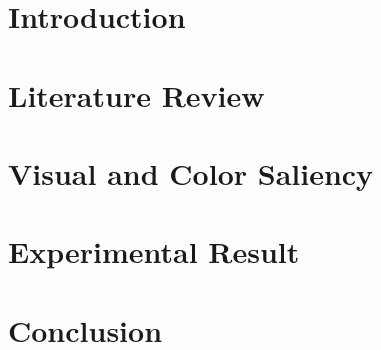 \documentclass[12pt]{report}
\begin{document}
\newpage
{}

\tableofcontents

\listoffigures


\chapter{Introduction}


\chapter{Literature Review}


\chapter{Visual and Color Saliency}


\chapter{Experimental Result}



\chapter{Conclusion}





\end{document}
